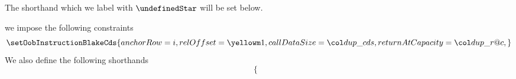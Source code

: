 \begin{description}
\begin{description}
				\saNote{} The shorthand \locOobResultHubSuccess{} which we label with $\undefinedStar$ will be set below.
			\item[\underline{Setting \oobMod{} values and shorthands:}] 
				we impose the following constraints
				\[
					\setOobInstructionBlakeCds {
						anchorRow        = i                           ,
						relOffset        = \prcBlakeFirstMiscRowOffset ,
						callDataSize     = \locPrcCds                  ,
						returnAtCapacity = \locPrcRac                  ,
					}
					\label{hub: instruction handling: call: precompiles: blake: hub success call}
				\]
				We also define the following shorthands
				\[
					\left\{ \begin{array}{lcl} \label{hub: instruction handling: call: precompiles: blake: shorthands}

\end{array}\]
\end{description}
\end{description}
